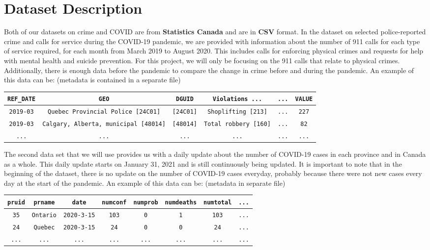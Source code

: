 \documentclass[fontsize=11pt]{article}
\begin{document}
\section{Dataset Description}
Both of our datasets on crime and COVID are from \textbf{Statistics Canada} and are in \textbf{CSV} format. In the dataset on selected police-reported crime and calls for service during the COVID-19 pandemic\cite{crime}, we are provided with information about the number of 911 calls for each type of service required, for each month from March 2019 to August 2020. This includes calls for enforcing physical crimes and requests for help with mental health and suicide prevention. For this project, we will only be focusing on the 911 calls that relate to physical crimes. Additionally, there is enough data before the pandemic to compare the change in crime before and during the pandemic. An example of this data can be: (metadata is contained in a separate file)

\begin{center}
	\begin{tabular}{|c|c|c|c|c|c|}
		\hline
		\verb+REF_DATE+ & \verb+GEO+ & \verb+DGUID+ & \verb+Violations ...+ & \verb+...+ & \verb+VALUE+ \\
		\hline
		\verb+2019-03+ & \verb+Quebec Provincial Police [24C01]+ & \verb+[24C01]+ & \verb+Shoplifting [213]+ & \verb+...+ & \verb+227+\\
		\hline
		\verb+2019-03+ & \verb+Calgary, Alberta, municipal [48014]+ & \verb+[48014]+ & \verb+Total robbery [160]+ & \verb+...+ & \verb+82+\\
		\hline
		\verb+...+ & \verb+...+ & \verb+...+ & \verb+...+ & \verb+...+ & \verb+...+\\
		\hline
	\end{tabular}
\end{center}

The second data set\cite{covid} that we will use provides us with a daily update about the number of COVID-19 cases in each province and in Canada as a whole. This daily update starts on January 31, 2021 and is still continuously being updated. It is important to note that in the beginning of the dataset, there is no update on the number of COVID-19 cases everyday, probably because there were not new cases every day at the start of the pandemic. An example of this data can be: (metadata in separate file)
\begin{center}
	\begin{tabular}{|c|c|c|c|c|c|c|c|}
		\hline
		\verb+pruid+ & \verb+prname+ & \verb+date+ & \verb+numconf+ & \verb+numprob+ & \verb+numdeaths+ & \verb+numtotal+ & \verb+...+\\
		\hline
		\verb+35+ & \verb+Ontario+ & \verb+2020-3-15+ & \verb+103+ & \verb+0+ & \verb+1+ & \verb+103+ & \verb+...+\\
		\hline
		\verb+24+ & \verb+Quebec+ & \verb+2020-3-15+ & \verb+24+ & \verb+0+ & \verb+0+ & \verb+24+ & \verb+...+\\
		\hline
		\verb+...+ & \verb+...+ & \verb+...+ & \verb+...+ & \verb+...+ & \verb+...+ & \verb+...+ & \verb+...+\\
		\hline
	\end{tabular}
\end{center}
\end{document}
